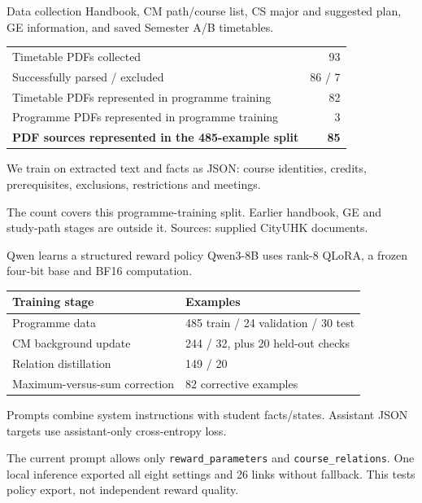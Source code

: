\documentclass[aspectratio=169,11pt]{beamer}
\newcommand{\smallnote}[1]{\par{\footnotesize\color{muted}#1\par}}
\begin{document}
\begin{frame}{Data collection}
Handbook, CM path/course list, CS major and suggested plan, GE information, and saved Semester A/B timetables.
\vspace{2mm}
\begin{tabular}{L{9.4cm}r}
\toprule
Timetable PDFs collected & 93\\
Successfully parsed / excluded & 86 / 7\\
Timetable PDFs represented in programme training & 82\\
Programme PDFs represented in programme training & 3\\\midrule
\textbf{PDF sources represented in the 485-example split} & \textbf{85}\\
\bottomrule
\end{tabular}\par
\vspace{2mm}
We train on extracted text and facts as JSON: course identities, credits, prerequisites, exclusions, restrictions and meetings.
\smallnote{The count covers this programme-training split. Earlier handbook, GE and study-path stages are outside it. Sources: supplied CityUHK documents.}
\end{frame}

\begin{frame}{Qwen learns a structured reward policy}
Qwen3-8B uses rank-8 QLoRA, a frozen four-bit base and BF16 computation.
\vspace{1mm}
\begin{tabular}{L{7.5cm}L{4.8cm}}
\toprule
Training stage & Examples\\\midrule
Programme data & 485 train / 24 validation / 30 test\\
CM background update & 244 / 32, plus 20 held-out checks\\
Relation distillation & 149 / 20\\
Maximum-versus-sum correction & 82 corrective examples\\
\bottomrule
\end{tabular}\par
\vspace{2mm}
Prompts combine system instructions with student facts/states. Assistant JSON targets use assistant-only cross-entropy loss.
\smallnote{The current prompt allows only \texttt{reward\_parameters} and \texttt{course\_relations}. One local inference exported all eight settings and 26 links without fallback. This tests policy export, not independent reward quality.}
\end{frame}
\end{document}
